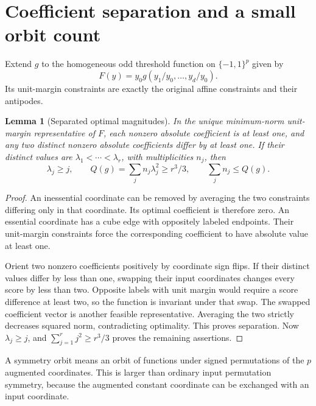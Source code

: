 \documentclass[11pt]{article}
\newtheorem{lemma}[theorem]{Lemma}
\begin{document}
\section{Coefficient separation and a small orbit count}
Extend $g$ to the homogeneous odd threshold function on $\{-1,1\}^p$ given by
\[
 F(y)=y_0g(y_1/y_0,\ldots,y_d/y_0).
\]
Its unit-margin constraints are exactly the original affine constraints and their antipodes.

\begin{lemma}[Separated optimal magnitudes]\label{lem:separation}
In the unique minimum-norm unit-margin representative of $F$, each nonzero absolute coefficient is at least one, and any two distinct nonzero absolute coefficients differ by at least one. If their distinct values are $\lambda_1<\cdots<\lambda_r$, with multiplicities $n_j$, then
\[
 \lambda_j\ge j,\qquad
 Q(g)=\sum_jn_j\lambda_j^2\ge r^3/3,
 \qquad \sum_jn_j\le Q(g).
\]
\end{lemma}
\begin{proof}
An inessential coordinate can be removed by averaging the two constraints differing only in that coordinate. Its optimal coefficient is therefore zero. An essential coordinate has a cube edge with oppositely labeled endpoints. Their unit-margin constraints force the corresponding coefficient to have absolute value at least one.

Orient two nonzero coefficients positively by coordinate sign flips. If their distinct values differ by less than one, swapping their input coordinates changes every score by less than two. Opposite labels with unit margin would require a score difference at least two, so the function is invariant under that swap. The swapped coefficient vector is another feasible representative. Averaging the two strictly decreases squared norm, contradicting optimality. This proves separation. Now $\lambda_j\ge j$, and
$\sum_{j=1}^rj^2\ge r^3/3$ proves the remaining assertions.
\end{proof}

A symmetry orbit means an orbit of functions under signed permutations of the $p$ augmented coordinates. This is larger than ordinary input permutation symmetry, because the augmented constant coordinate can be exchanged with an input coordinate.
\end{document}

